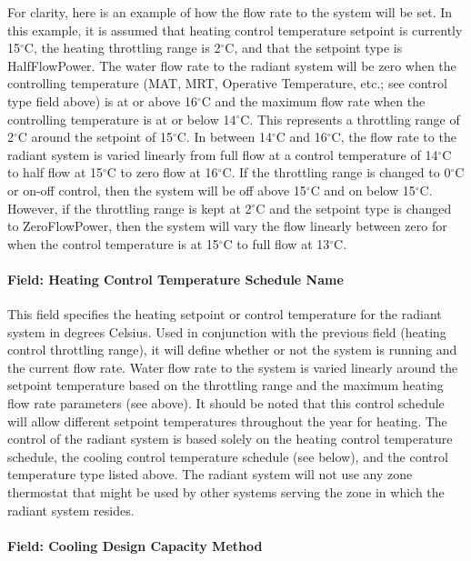 For clarity, here is an example of how the flow rate to the system will be set.  In this example, it is assumed that heating control temperature setpoint is currently 15$^\circ$C, the heating throttling range is 2$^\circ$C, and that the setpoint type is HalfFlowPower.  The water flow rate to the radiant system will be zero when the controlling temperature (MAT, MRT, Operative Temperature, etc.; see control type field above) is at or above 16$^\circ$C and the maximum flow rate when the controlling temperature is at or below 14$^\circ$C. This represents a throttling range of 2$^\circ$C around the setpoint of 15$^\circ$C. In between 14$^\circ$C and 16$^\circ$C, the flow rate to the radiant system is varied linearly from full flow at a control temperature of 14$^\circ$C to half flow at 15$^\circ$C to zero flow at 16$^\circ$C.  If the throttling range is changed to 0$^\circ$C or on-off control, then the system will be off above 15$^\circ$C and on below 15$^\circ$C.  However, if the throttling range is kept at 2$^\circ$C and the setpoint type is changed to ZeroFlowPower, then the system will vary the flow linearly between zero for when the control temperature is at 15$^\circ$C to full flow at 13$^\circ$C.

\paragraph{Field: Heating Control Temperature Schedule Name}\label{field-heating-control-temperature-schedule-name}

This field specifies the heating setpoint or control temperature for the radiant system in degrees Celsius. Used in conjunction with the previous field (heating control throttling range), it will define whether or not the system is running and the current flow rate. Water flow rate to the system is varied linearly around the setpoint temperature based on the throttling range and the maximum heating flow rate parameters (see above). It should be noted that this control schedule will allow different setpoint temperatures throughout the year for heating. The control of the radiant system is based solely on the heating control temperature schedule, the cooling control temperature schedule (see below), and the control temperature type listed above. The radiant system will not use any zone thermostat that might be used by other systems serving the zone in which the radiant system resides.

\paragraph{Field: Cooling Design Capacity Method}\label{field-cooling-design-capacity-method-000}

